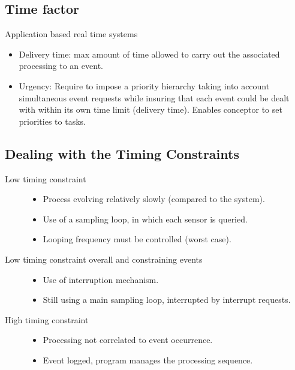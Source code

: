 \documentclass[10pt]{article}
\theoremstyle{plain}
\theoremstyle{definition}
\theoremstyle{remark}
\begin{document}
\subsection{Time factor}
Application based real time systems 
\begin{itemize}
	\item Delivery time: max amount of time allowed to carry out the associated
		processing to an event.
	\item Urgency: Require to impose a priority hierarchy taking into account
		simultaneous event requests while insuring that each event could be
		dealt with within its own time limit (delivery time). Enables conceptor
		to set priorities to tasks.
\end{itemize}

\subsection{Dealing with the Timing Constraints}
\begin{description}
	\item [Low timing constraint]
		\begin{itemize}
			\item Process evolving relatively slowly (compared to the system).
			\item Use of a sampling loop, in which  each sensor is queried.
			\item Looping frequency must be controlled (worst case).
		\end{itemize}
	\item[Low timing constraint overall and  constraining events]
		\begin{itemize}
			\item Use of interruption mechanism.
			\item Still using a main sampling loop, interrupted by interrupt
				requests.
		\end{itemize}
	\item[High timing constraint]
		\begin{itemize}
			\item Processing not correlated to event occurrence.
			\item Event logged, program manages the processing sequence.
		\end{itemize}
\end{description}
\end{document}
